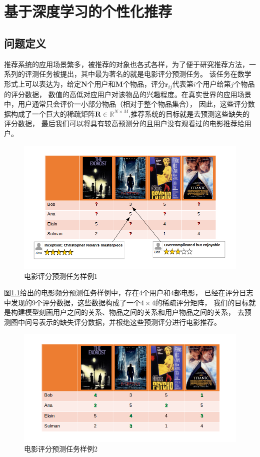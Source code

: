 \chapter{基于深度学习的个性化推荐}
\section{问题定义}
推荐系统的应用场景繁多，被推荐的对象也各式各样，为了便于研究推荐方法，一系列的评测任务被提出，其中最为著名的就是电影评分预测任务。
该任务在数学形式上可以表达为，给定$\mathbf{N}$个用户和$\mathbf{M}$个物品，评分$\mathbf{r}_{ij}$代表第$i$个用户给第$j$个物品的评分数据，
数值的高低对应用户对该物品的兴趣程度。在真实世界的应用场景中，用户通常只会评价一小部分物品（相对于整个物品集合），
因此，这些评分数据构成了一个巨大的稀疏矩阵$\mathbf{R} \in \mathbb{R}^{N \times M}$,推荐系统的目标就是去预测这些缺失的评分数据，
最后我们可以将具有较高预测分的且用户没有观看过的电影推荐给用户。

\begin{figure}[htbp]
\centering
\includegraphics[scale=0.6]{images/task1.png}
\caption{电影评分预测任务样例1}
\label{fig:task1}
\end{figure}

图\ref{fig:task1}给出的电影频分预测任务样例中，存在$4$个用户和$4$部电影，
已经在评分日志中发现的9个评分数据，这些数据构成了一个$4 \times 4$的稀疏评分矩阵，
我们的目标就是构建模型刻画用户之间的关系、物品之间的关系和用户物品之间的关系，
去预测图中问号表示的缺失评分数据，并根绝这些预测评分进行电影推荐。

\begin{figure}[htbp]
\centering
\includegraphics[scale=0.6]{images/task2.png}
\caption{电影评分预测任务样例2}
\label{fig:task2}
\end{figure}

